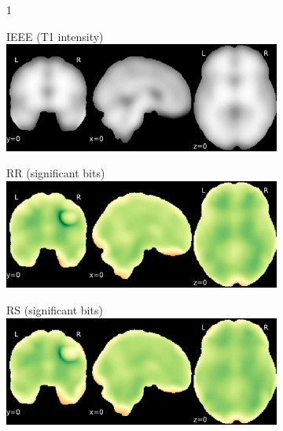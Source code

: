 \documentclass{article}
\begin{document}
\begin{appendices}
\begin{landscape}
\begin{figure}
            \vspace*{-2cm}
            \centering
            \begin{subfigure}[b][][c]{0.01\paperwidth} 1 \vspace*{-45pt} \end{subfigure}
            \begin{subfigure}[t]{0.2\paperheight}
                \centering
                IEEE (T1 intensity)
                \includegraphics[width=\textwidth]{figures/sig/20mm/ieee_ds001600_sub-1.pdf}
            \end{subfigure}
            \begin{subfigure}[t]{0.2\paperheight}
                \centering
                RR (significant bits)
                \includegraphics[width=\textwidth]{figures/sig/20mm/rr_ds001600_sub-1_sig.pdf}
            \end{subfigure}
            \begin{subfigure}[t]{0.2\paperheight}
                \centering
                RS (significant bits)
                \includegraphics[width=\textwidth]{figures/sig/20mm/rs_ds001600_sub-1_sig.pdf}

\end{subfigure}
\end{figure}
\end{landscape}
\end{appendices}
\end{document}
